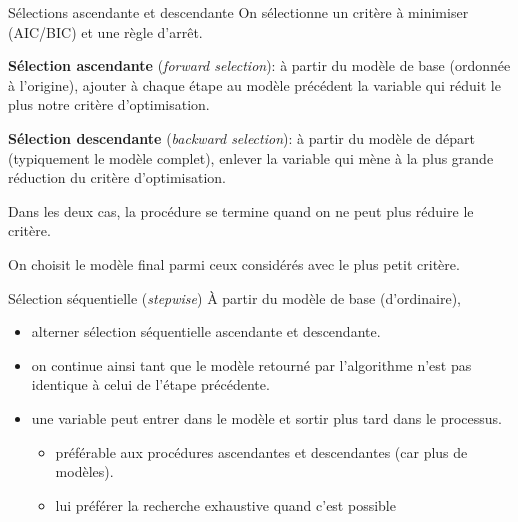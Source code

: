 \documentclass[
  ignorenonframetext,
]{beamer}
\providecommand{\tightlist}{%
  \setlength{\itemsep}{0pt}\setlength{\parskip}{0pt}}\usepackage{longtable,booktabs,array}
\begin{document}
\begin{frame}{Sélections ascendante et descendante}
\label{suxe9lections-ascendante-et-descendante}
On sélectionne un critère à minimiser (AIC/BIC) et une règle d'arrêt.

\textbf{Sélection ascendante} (\emph{forward selection}): à partir du
modèle de base (ordonnée à l'origine), ajouter à chaque étape au modèle
précédent la variable qui réduit le plus notre critère d'optimisation.

\textbf{Sélection descendante} (\emph{backward selection}): à partir du
modèle de départ (typiquement le modèle complet), enlever la variable
qui mène à la plus grande réduction du critère d'optimisation.

Dans les deux cas, la procédure se termine quand on ne peut plus réduire
le critère.

On choisit le modèle final parmi ceux considérés avec le plus petit
critère.
\end{frame}

\begin{frame}{Sélection séquentielle (\emph{stepwise})}
\label{suxe9lection-suxe9quentielle-stepwise}
À partir du modèle de base (d'ordinaire),

\begin{itemize}
\tightlist
\item
  alterner sélection séquentielle ascendante et descendante.
\item
  on continue ainsi tant que le modèle retourné par l'algorithme n'est
  pas identique à celui de l'étape précédente.
\item
  une variable peut entrer dans le modèle et sortir plus tard dans le
  processus.

  \begin{itemize}
  \tightlist
  \item
    préférable aux procédures ascendantes et descendantes (car plus de
    modèles).
  \item
    lui préférer la recherche exhaustive quand c'est possible
  \end{itemize}
\end{itemize}
\end{frame}
\end{document}
